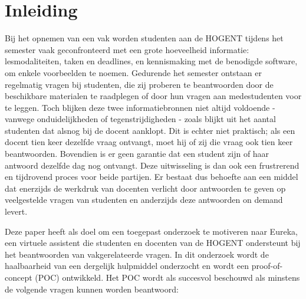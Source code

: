


% 

\section{Inleiding}%
\label{sec:inleiding}

Bij het opnemen van een vak worden studenten aan de HOGENT tijdens het semester vaak geconfronteerd met een grote hoeveelheid informatie: lesmodaliteiten, taken en deadlines, en kennismaking met de benodigde software, om enkele voorbeelden te noemen. Gedurende het semester ontstaan er regelmatig vragen bij studenten, die zij proberen te beantwoorden door de beschikbare materialen te raadplegen of door hun vragen aan medestudenten voor te leggen. Toch blijken deze twee informatiebronnen niet altijd voldoende - vanwege onduidelijkheden of tegenstrijdigheden - zoals blijkt uit het aantal studenten dat alsnog bij de docent aanklopt. Dit is echter niet praktisch; als een docent tien keer dezelfde vraag ontvangt, moet hij of zij die vraag ook tien keer beantwoorden. Bovendien is er geen garantie dat een student zijn of haar antwoord dezelfde dag nog ontvangt. Deze uitwisseling is dan ook een frustrerend en tijdrovend proces voor beide partijen. Er bestaat dus behoefte aan een middel dat enerzijds de werkdruk van docenten verlicht door antwoorden te geven op veelgestelde vragen van studenten en anderzijds deze antwoorden on demand levert.

Deze paper heeft als doel om een toegepast onderzoek te motiveren naar Eureka, een virtuele assistent die studenten en docenten van de HOGENT ondersteunt bij het beantwoorden van vakgerelateerde vragen. In dit onderzoek wordt de haalbaarheid van een dergelijk hulpmiddel onderzocht en wordt een proof-of-concept (POC) ontwikkeld. Het POC wordt als succesvol beschouwd als minstens de volgende vragen kunnen worden beantwoord:

